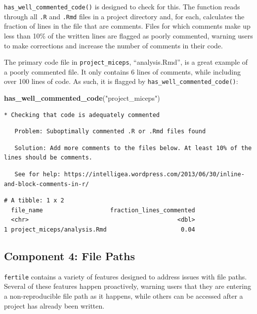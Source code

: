 \documentclass[12pt,twoside]{reedthesis}
\newenvironment{Shaded}{\begin{snugshade}}{\end{snugshade}}
\newcommand{\KeywordTok}[1]{\textcolor[rgb]{0.13,0.29,0.53}{\textbf{#1}}}
\newcommand{\NormalTok}[1]{#1}
\newcommand{\StringTok}[1]{\textcolor[rgb]{0.31,0.60,0.02}{#1}}
\begin{document}
\texttt{has\_well\_commented\_code()} is designed to check for this. The function reads through all \texttt{.R} and \texttt{.Rmd} files in a project directory and, for each, calculates the fraction of lines in the file that are comments. Files for which comments make up less than 10\% of the written lines are flagged as poorly commented, warning users to make corrections and increase the number of comments in their code.

The primary code file in \texttt{project\_miceps}, ``analysis.Rmd'', is a great example of a poorly commented file. It only contains 6 lines of comments, while including over 100 lines of code. As such, it is flagged by \texttt{has\_well\_commented\_code()}:
\begin{Shaded}
\begin{Highlighting}[]
\KeywordTok{has_well_commented_code}\NormalTok{(}\StringTok{"project_miceps"}\NormalTok{)}
\end{Highlighting}
\end{Shaded}
\begin{verbatim}
* Checking that code is adequately commented
\end{verbatim}
\begin{verbatim}
   Problem: Suboptimally commented .R or .Rmd files found
\end{verbatim}
\begin{verbatim}
   Solution: Add more comments to the files below. At least 10% of the lines should be comments.
\end{verbatim}
\begin{verbatim}
   See for help: https://intelligea.wordpress.com/2013/06/30/inline-and-block-comments-in-r/
\end{verbatim}
\begin{verbatim}
# A tibble: 1 x 2
  file_name                   fraction_lines_commented
  <chr>                                          <dbl>
1 project_miceps/analysis.Rmd                     0.04
\end{verbatim}
\hypertarget{component-4-file-paths}{%
\subsection{Component 4: File Paths}\label{component-4-file-paths}}

\texttt{fertile} contains a variety of features designed to address issues with file paths. Several of these features happen proactively, warning users that they are entering a non-reproducible file path as it happens, while others can be accessed after a project has already been written.
\end{document}
